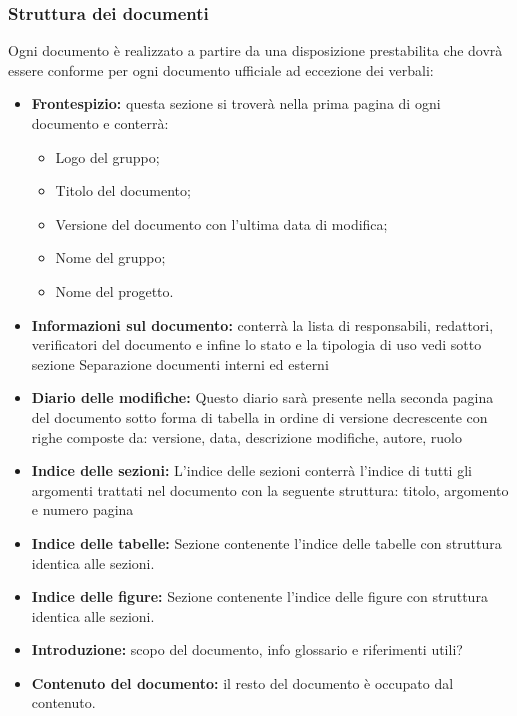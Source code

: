\documentclass[NormeDiProgetto.tex]{subfiles}
\begin{document}
	\subsubsection{Struttura dei documenti}
		Ogni documento è realizzato a partire da una disposizione prestabilita che dovrà essere conforme per ogni documento ufficiale ad eccezione dei verbali: %
		\begin{itemize}
			\item \textbf{Frontespizio:} questa sezione si troverà nella prima pagina di ogni documento e conterrà:
			\begin{itemize}
				\item Logo del gruppo;
				\item Titolo del documento;
				\item Versione del documento con l'ultima data di modifica;
				\item Nome del gruppo;
				\item Nome del progetto.
			\end{itemize}
			
			\item \textbf{Informazioni sul documento:} conterrà la lista di responsabili,
			redattori, verificatori del documento e infine lo stato e la tipologia di uso vedi sotto sezione {Separazione documenti interni ed esterni}%
			
			\item \textbf{Diario delle modifiche:}
			Questo diario sarà presente nella seconda pagina del documento sotto forma di tabella in ordine di versione decrescente con righe composte da: versione, data, descrizione modifiche, autore, ruolo
			
			\item \textbf{Indice delle sezioni:}
			L'indice delle sezioni conterrà l'indice di tutti gli argomenti trattati nel documento con la seguente struttura: titolo, argomento e numero pagina
			
			\item \textbf{Indice delle tabelle:} %
			Sezione contenente l'indice delle tabelle con struttura identica alle sezioni. 
			
			\item \textbf{Indice delle figure:} %
			Sezione contenente l'indice delle figure con struttura identica alle sezioni. 
			
			\item \textbf{Introduzione:}
			scopo del documento, info glossario e riferimenti utili?
			 
			\item \textbf{Contenuto del documento:} il resto del documento è occupato dal contenuto.
			
			
		\end{itemize}
		
\end{document}
